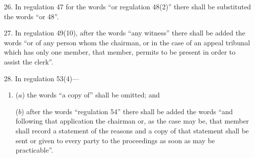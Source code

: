 \documentclass[12pt,a4paper]{article}
\begin{document}
\medskip

26.  In regulation 47 for the words “or regulation 48(2)” there shall be substituted the words “or 48”.

\medskip

27.  In regulation 49(10), after the words “any witness” there shall be added the words “or of any person whom the chairman, or in the case of an appeal tribunal which has only one member, that member, permits to be present in order to assist the clerk”.

\medskip

28.  In regulation 53(4)—
\begin{enumerate}\item[]
($a$) the words “a copy of” shall be omitted; and

($b$) after the words “regulation 54” there shall be added the words “and following that application the chairman or, as the case may be, that member shall record a statement of the reasons and a copy of that statement shall be sent or given to every party to the proceedings as soon as may be practicable”.
\end{enumerate}

\end{document}
